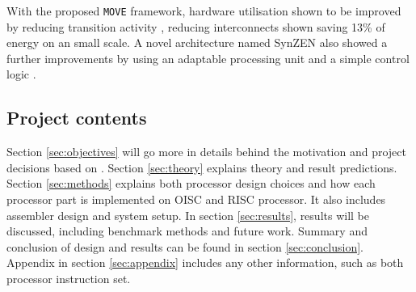 With the proposed \texttt{MOVE} framework, hardware utilisation shown to be improved by reducing transition activity \autocite{1207041}, reducing interconnects shown saving 13\% of energy \autocite{6972455} on an small scale. A novel architecture named SynZEN also showed a further improvements by using an adaptable processing unit and a simple control logic \autocite{6403142}.

\subsection{Project contents}
Section \ref{sec:objectives} will go more in details behind the motivation and project decisions based on . Section \ref{sec:theory} explains theory and result predictions. Section \ref{sec:methods} explains both processor design choices and how each processor part is implemented on OISC and RISC processor. It also includes assembler design and system setup. In section \ref{sec:results}, results will be discussed, including benchmark methods and future work. Summary and conclusion of design and results can be found in section \ref{sec:conclusion}. Appendix in section \ref{sec:appendix} includes any other information, such as both processor instruction set.

